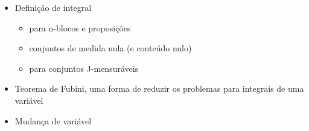 
\begin{previouslyseen}
    \begin{itemize}
        \item Definição de integral
	    \begin{itemize}
	        \item para n-blocos e proposições
		\item conjuntos de medida nula (e conteúdo nulo)
		\item para conjuntos J-mensuráveis
	    \end{itemize}
	\item Teorema de Fubini, uma forma de reduzir os problemas para integrais de uma variável
	\item Mudança de variável
    \end{itemize}
\end{previouslyseen}

